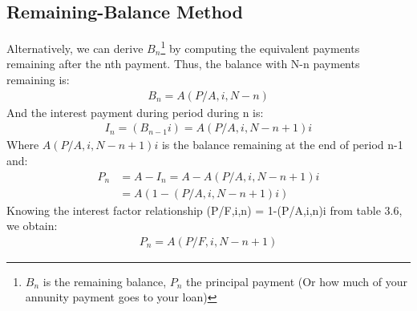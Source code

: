 \documentclass{report} %
\begin{document}
\subsection*{Remaining-Balance Method}
Alternatively, we can derive $B_n$\footnote{$B_n$ is the remaining balance, $P_n$ the principal payment (Or how much of your annunity payment goes to your loan)} by computing the equivalent payments remaining after the nth payment. Thus, the balance with N-n payments remaining is:
\begin{equation*}
    \begin{aligned}
        B_n = A(P/A,i,N-n)
    \end{aligned}
\end{equation*}
And the interest payment during period during n is:
\begin{equation*}
    \begin{aligned}
        I_n = (B_{n-1}i) = A(P/A,i,N-n+1)i 
    \end{aligned}
\end{equation*}
Where $A(P/A,i,N-n+1)i$ is the balance remaining at the end of period n-1 and:
\begin{equation*}
    \begin{aligned}
        P_n &= A - I_n = A - A(P/A,i,N-n+1)i\\
            &=A(1-(P/A,i,N-n+1)i)
    \end{aligned}
\end{equation*} 
Knowing the interest factor relationship (P/F,i,n) = 1-(P/A,i,n)i from table 3.6, we obtain:
\begin{equation*}
    \begin{aligned}
        P_n = A(P/F,i,N-n+1)
    \end{aligned}
\end{equation*} 
\end{document}
